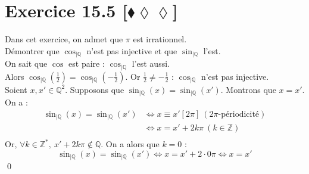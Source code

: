 \documentclass[10pt]{article}
\begin{document}
\section*{Exercice 15.5 [$\blacklozenge\lozenge\lozenge$]}
\begin{tcolorbox}[enhanced, width=7.6in, center, size=fbox, fontupper=\large, drop shadow southwest]
    Dans cet exercice, on admet que $\pi$ est irrationnel.\\
    Démontrer que $\cos_{|\mathbb{Q}}$ n'est pas injective et que $\sin_{|\mathbb{Q}}$ l'est.\\[0.2cm]
    On sait que $\cos$ est paire : $\cos_{|\mathbb{Q}}$ l'est aussi.\\
    Alors $\cos_{|\mathbb{Q}}(\frac{1}{2}) = \cos_{|\mathbb{Q}}(-\frac{1}{2})$. Or $\frac{1}{2} \neq -\frac{1}{2}$ : $\cos_{|\mathbb{Q}}$ n'est pas injective.\\[0.2cm]
    Soient $x,x'\in\mathbb{Q}^2$. Supposons que $\sin_{|\mathbb{Q}}(x) = \sin_{|\mathbb{Q}}(x')$. Montrons que $x=x'$.\\
    On a :
    \begin{align*}
        \sin_{|\mathbb{Q}}(x) = \sin_{|\mathbb{Q}}(x') &\iff x \equiv x' [2\pi] ~ (2\pi\text{-périodicité}) \\
        &\iff x = x' + 2k\pi ~ (k\in\mathbb{Z})\\
    \end{align*}
    Or, $\forall{k\in\mathbb{Z}^*}, ~ x' + 2k\pi \notin \mathbb{Q}$. On a alors que $k=0$ :
    \begin{equation*}
        \sin_{|\mathbb{Q}}(x) = \sin_{|\mathbb{Q}}(x') \iff x = x' + 2\cdot0\pi \iff x = x'
    \end{equation*}
    \qed
\end{tcolorbox}
\end{document}
